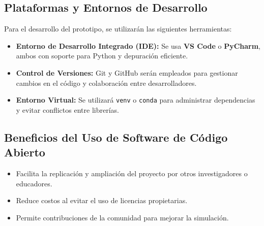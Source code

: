 \subsection*{Plataformas y Entornos de Desarrollo}

Para el desarrollo del prototipo, se utilizarán las siguientes herramientas:

\begin{itemize}
    \item \textbf{Entorno de Desarrollo Integrado (IDE):} Se usa \textbf{VS Code} o \textbf{PyCharm}, ambos con soporte para Python y depuración eficiente.
    \item \textbf{Control de Versiones:} Git y GitHub serán empleados para gestionar cambios en el código y colaboración entre desarrolladores.
    \item \textbf{Entorno Virtual:} Se utilizará \texttt{venv} o \texttt{conda} para administrar dependencias y evitar conflictos entre librerías.
\end{itemize}

\subsection*{Beneficios del Uso de Software de Código Abierto}
\begin{itemize}
    \item Facilita la replicación y ampliación del proyecto por otros investigadores o educadores.
    \item Reduce costos al evitar el uso de licencias propietarias.
    \item Permite contribuciones de la comunidad para mejorar la simulación.
\end{itemize}

